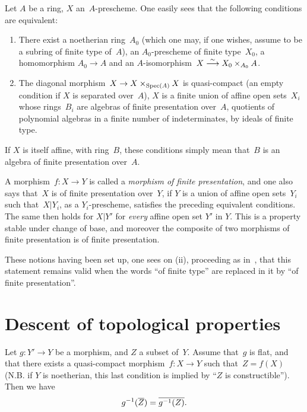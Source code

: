 \begin{remarks}
\label{VIII.3.6}
Let $A$ be a ring, $X$ an~$A$-prescheme. One easily sees that
the following conditions are equivalent:

\begin{enumerate}
\item[(i)] There exist a noetherian ring~$A_{0}$ (which one may, if
one wishes, assume to be a subring of finite type of~$A$), an
$A_{0}$-prescheme of finite type~$X_{0}$, a homomorphism
$A_0\to A$
and an $A$-isomorphism~$X\overset{\sim}{\longrightarrow} X_{0}\times_{A_{0}}A$.
\item[(ii)] The diagonal morphism~$X\to X\times_{\Spec(A)}X$ is
quasi-compact (an empty condition if $X$ is separated over~$A$), $X$
is a finite union of affine open sets~$X_{i}$ whose rings~$B_{i}$
are algebras of finite presentation over~$A$, \ie quotients of
polynomial algebras in a finite number of indeterminates, by ideals
of finite type.
\end{enumerate}

If $X$ is itself affine, with ring~$B$, these conditions simply
mean that~$B$ is an algebra of finite presentation over~$A$.

A morphism~$f\colon X\to Y$ is called a \emph{morphism of finite
presentation}, and one also says that~$X$ is of finite presentation
over~$Y$, if $Y$ is a union of affine open sets~$Y_{i}$ such
that~$X|Y_{i}$, as a $Y_{i}$-prescheme, satisfies the preceding
equivalent conditions. The same then holds for $X|Y'$ for
\emph{every} affine open set $Y'$ in $Y$. This is a property stable
under change of base, and moreover the composite of two morphisms of
finite presentation is of finite presentation.

These notions having been set up, one sees on (ii), proceeding as
in~, that this statement remains valid when the words
``of finite type'' are replaced in it by ``of finite presentation''.
\end{remarks}

\section{Descent of topological properties}
\label{VIII.4}

\begin{theorem}
\label{VIII.4.1}
Let $g\colon Y'\to Y$ be a morphism, and $Z$ a subset of~$Y$. Assume
that~$g$ is flat, and that there exists a quasi-compact
morphism~$f\colon X\to Y$ such that~$Z=f(X)$ (N.B. if $Y$ is
noetherian, this last condition is implied by
``$Z$ is constructible''). Then we have
$$
g^{-1}(\overline{Z})=\overline{g^{-1}(Z)}.
$$
\end{theorem}

